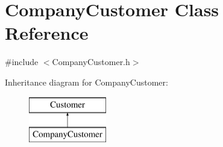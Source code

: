 \hypertarget{classCompanyCustomer}{}\section{Company\+Customer Class Reference}
\label{classCompanyCustomer}


{\ttfamily \#include $<$Company\+Customer.\+h$>$}

Inheritance diagram for Company\+Customer\+:\begin{figure}[H]
\begin{center}
\leavevmode
\includegraphics[height=2.000000cm]{classCompanyCustomer}
\end{center}
\end{figure}
